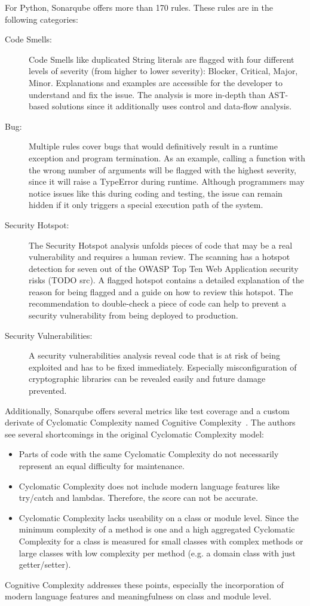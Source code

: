 For Python, Sonarqube offers more than 170 rules. These rules are in the following categories:
\begin{description}
    \item[Code Smells:] Code Smells like duplicated String literals are flagged with four different levels of severity (from higher to lower severity): Blocker, Critical, Major, Minor. Explanations and examples are accessible for the developer to understand and fix the issue. The analysis is more in-depth than AST-based solutions since it additionally uses control and data-flow analysis.
    \item[Bug:] Multiple rules cover bugs that would definitively result in a runtime exception and program termination. As an example, calling a function with the wrong number of arguments will be flagged with the highest severity, since it will raise a TypeError during runtime. Although programmers may notice issues like this during coding and testing, the issue can remain hidden if it only triggers a special execution path of the system.
    \item[Security Hotspot:] The Security Hotspot analysis unfolds pieces of code that may be a real vulnerability and requires a human review. The scanning has a hotspot detection for seven out of the OWASP Top Ten Web Application security risks (TODO src). A flagged hotspot contains a detailed explanation of the reason for being flagged and a guide on how to review this hotspot. The recommendation to double-check a piece of code can help to prevent a security vulnerability from being deployed to production.
    \item[Security Vulnerabilities:]  A security vulnerabilities analysis reveal code that is at risk of being exploited and has to be fixed immediately. Especially misconfiguration of cryptographic libraries can be revealed easily and future damage prevented.   
\end{description}

Additionally, Sonarqube offers several metrics like test coverage and a custom derivate of Cyclomatic Complexity named Cognitive Complexity~\cite{campbell2018cognitive}. The authors see several shortcomings in the original Cyclomatic Complexity model:
\begin{itemize}
    \item Parts of code with the same Cyclomatic Complexity do not necessarily represent an equal difficulty for maintenance.
    \item  Cyclomatic Complexity does not include modern language features like try/catch and lambdas. Therefore, the score can not be accurate.
    \item Cyclomatic Complexity lacks useability on a class or module level. Since the minimum complexity of a method is one and a high aggregated Cyclomatic Complexity for a class is measured for small classes with complex methods or large classes with low complexity per method (e.g. a domain class with just getter/setter).
\end{itemize}
Cognitive Complexity addresses these points, especially the incorporation of modern language features and meaningfulness on class and module level.

